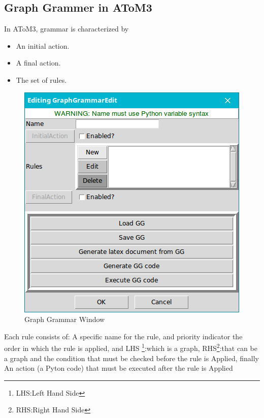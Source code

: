 \subsection{Graph Grammer in AToM3}
In AToM3, grammar is characterized by

\begin{minipage}{0.5\textwidth}

\begin{itemize}
\newcommand{\localtextbulletone}{\textcolor{gray}{\raisebox{.45ex}{\rule{.6ex}{.6ex}}}}
\renewcommand{\labelitemi}{\localtextbulletone}
\item An initial action.
\item A final action.
\item The set of rules. 
\end{itemize}

\end{minipage} \hfill
\begin{minipage}{0.45\textwidth}
\begin{figure}[H]
	\centering 
	\includegraphics[scale=0.5]{ch3/img/GraphGrammar}
	\caption{\label{fig:Graph Grammar Window}Graph Grammar Window}
\end{figure}
\end{minipage} 
\linebreak

Each rule consists of: 
A specific name for the rule, and priority indicator the order in which the rule is applied, and LHS \footnote{LHS:Left Hand Side}:which is a graph, RHS\footnote{RHS:Right Hand Side}:that can be a graph and the condition that must be checked before the rule is Applied, finally An action (a Pyton code) that must be executed after the rule is
Applied

